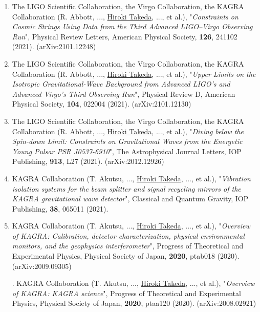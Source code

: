\documentclass[uplatex, 11pt]{jsarticle}
\newcommand{\ctext}[1]{\ooalign{
\hfil\resizebox{\width}{\height}{#1}\hfil
\crcr
\raise-.1mm\hbox{\Large$\bigcirc$}}}
\begin{document}
\begin{enumerate}
\item The LIGO Scientific Collaboration, the Virgo Collaboration, the KAGRA Collaboration (R. Abbott, ..., \uline{Hiroki Takeda}, ..., et al.), "\emph{Constraints on Cosmic Strings Using Data from the Third Advanced LIGO–Virgo Observing Run}", Physical Review Letters, American Physical Society, {\bf 126}, 241102 (2021). (arXiv:2101.12248)\\

\item The LIGO Scientific Collaboration, the Virgo Collaboration, the KAGRA Collaboration (R. Abbott, ..., \uline{Hiroki Takeda}, ..., et al.), "\emph{Upper Limits on the Isotropic Gravitational-Wave Background from Advanced LIGO's and Advanced Virgo's Third Observing Run}", Physical Review D, American Physical Society, {\bf 104}, 022004 (2021). (arXiv:2101.12130)\\

\item The LIGO Scientific Collaboration, the Virgo Collaboration, the KAGRA Collaboration (R. Abbott, ..., \uline{Hiroki Takeda}, ..., et al.), "\emph{Diving below the Spin-down Limit: Constraints on Gravitational Waves from the Energetic Young Pulsar PSR J0537-6910}", The Astrophysical Journal Letters, IOP Publishing, {\bf 913}, L27 (2021). (arXiv:2012.12926)\\

\item KAGRA Collaboration (T. Akutsu, ..., \uline{Hiroki Takeda}, ..., et al.),
"\emph{Vibration isolation systems for the beam splitter and signal recycling mirrors of the KAGRA gravitational wave detector}",
Classical and Quantum Gravity, IOP Publishing, {\bf 38}, 065011 (2021).\\

\item KAGRA Collaboration (T. Akutsu, ..., \uline{Hiroki Takeda}, ..., et al.), "\emph{Overview of KAGRA: Calibration, detector characterization, physical environmental monitors, and the geophysics interferometer}", Progress of Theoretical and Experimental Physics, Physical Society of Japan, {\bf 2020}, ptab018 (2020). (arXiv:2009.09305)\\

\item[\ctext{49}.] KAGRA Collaboration (T. Akutsu, ..., \uline{Hiroki Takeda}, ..., et al.), "\emph{Overview of KAGRA: KAGRA science}", Progress of Theoretical and Experimental Physics, Physical Society of Japan, {\bf 2020}, ptaa120 (2020). (arXiv:2008.02921)\\


\end{enumerate}
\end{document}
